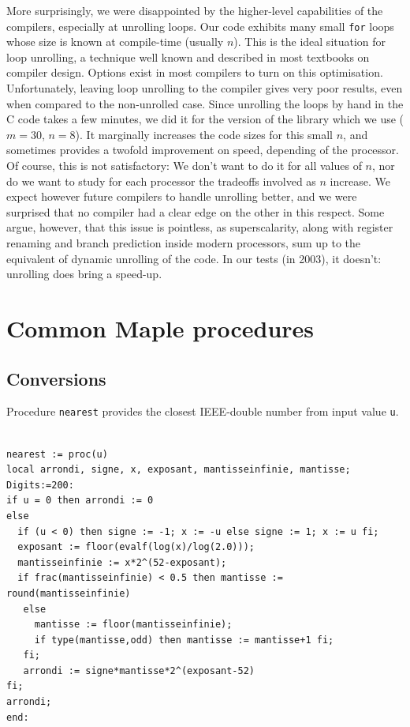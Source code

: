 More surprisingly, we were disappointed by the higher-level
capabilities of the compilers, especially at unrolling loops. Our code
exhibits many small \texttt{for} loops whose size is known at
compile-time (usually $n$). This is the ideal situation for loop
unrolling, a technique well known and described in most textbooks on
compiler design. Options exist in most compilers to turn on this
optimisation. Unfortunately, leaving loop unrolling to the compiler
gives very poor results, even when compared to the non-unrolled case.
Since unrolling the loops by hand in the C code takes a few minutes,
we did it for the version of the library which we use ($m=30$, $n=8$).
It marginally increases the code sizes for this small $n$, and
sometimes provides a twofold improvement on speed, depending of the
processor. Of course, this is not satisfactory: We don't want to do it
for all values of $n$, nor do we want to study for each processor the
tradeoffs involved as $n$ increase. We expect however future compilers
to handle unrolling better, and we were surprised that no compiler had
a clear edge on the other in this respect. Some argue, however, that
this issue is pointless, as superscalarity, along with register
renaming and branch prediction inside modern processors, sum up to the
equivalent of dynamic unrolling of the code. In our tests (in 2003), it
doesn't: unrolling does bring a speed-up.








\section{Common Maple procedures \label{section:commonMaple}}


\subsection{Conversions}

Procedure \texttt{nearest} provides the closest IEEE-double number
from input value \texttt{u}.

\begin{lstlisting}[caption={nearest},firstnumber=1]

nearest := proc(u)
local arrondi, signe, x, exposant, mantisseinfinie, mantisse;
Digits:=200:
if u = 0 then arrondi := 0
else 
  if (u < 0) then signe := -1; x := -u else signe := 1; x := u fi;
  exposant := floor(evalf(log(x)/log(2.0)));
  mantisseinfinie := x*2^(52-exposant);
  if frac(mantisseinfinie) < 0.5 then mantisse := round(mantisseinfinie)
   else
     mantisse := floor(mantisseinfinie);
     if type(mantisse,odd) then mantisse := mantisse+1 fi;
   fi;
   arrondi := signe*mantisse*2^(exposant-52)
fi;
arrondi;
end:
\end{lstlisting}



